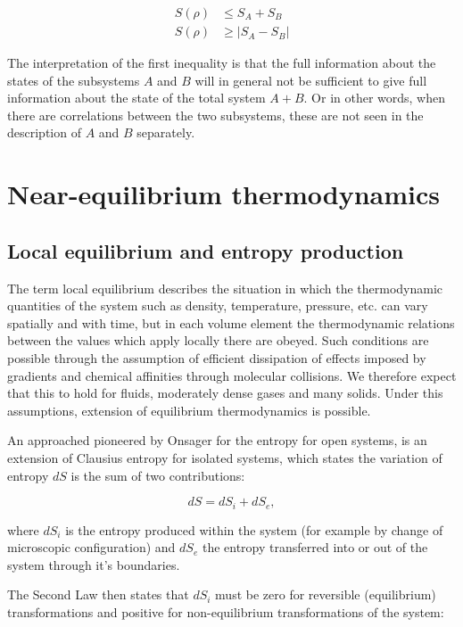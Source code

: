 \documentclass[a4paper,12pt]{article}
\begin{document}
\begin{equation}
\begin{aligned}
	S(\rho) &\leq S_A + S_B	\\
	S(\rho) &\geq \left| S_A - S_B \right|
\end{aligned}
\end{equation}

The interpretation of the first inequality is that the full information about the states of the subsystems $A$ and $B$ will in general not be sufficient to give full information about the state of the total system $A+B$. Or in other words, when there are correlations between the two subsystems, these are not seen in the description of $A$ and $B$ separately. 

\section{Near-equilibrium thermodynamics}
\label{NearEquilibrium}
\subsection{Local equilibrium and entropy production}

The term local equilibrium describes the situation in which the thermodynamic quantities of the system such as density, temperature, pressure, etc. can vary spatially and with time, but in each volume element the thermodynamic relations between the values which apply locally there are obeyed. 
Such conditions are possible through the assumption of efficient dissipation of effects imposed by gradients and chemical affinities through molecular collisions. We therefore expect that this to hold for fluids, moderately dense gases and many solids.
Under this assumptions, extension of equilibrium thermodynamics is possible\cite{Anonymous:NJxQY1gt}.

An approached pioneered by Onsager for the entropy for open systems, is an extension of Clausius entropy for isolated systems, which states the variation of entropy $dS$ is the sum of two contributions: 

\begin{equation}
  	dS=dS_i+dS_e,
\end{equation}

where $dS_i$ is the entropy produced within the system (for example by change of microscopic configuration) and $dS_e$ the entropy transferred into or out of the system through it's boundaries.

The Second Law then states that $dS_i$ must be zero for reversible (equilibrium) transformations and positive for non-equilibrium transformations of the system\cite{DeGroot:2013ue}:
\end{document}

